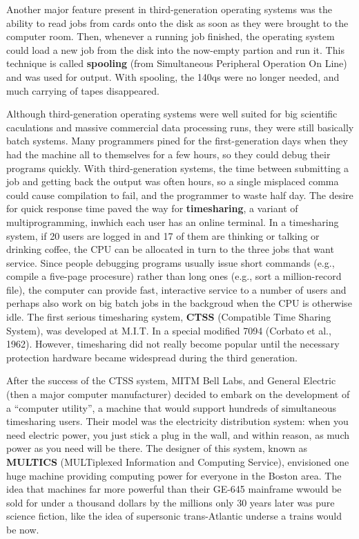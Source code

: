 \documentclass{book}
\newcommand {\kw}  [1] {\textbf{#1}}
\begin{document}
Another major feature present in third-generation operating systems was the ability to read jobs from cards onto the disk 
as soon as they were brought to the computer room.
Then, whenever a running job finished, the operating system could load a new job from the disk into the now-empty partion and run it.
This technique is called \kw{spooling} (from Simultaneous Peripheral Operation On Line) and was used for output.
With spooling, the 140qs were no longer needed, and much carrying of tapes disappeared.

Although third-generation operating systems were well suited for big scientific caculations and massive commercial data processing runs, 
they were still basically batch systems.
Many programmers pined for the first-generation days when they had the machine all to themselves for a few hours, 
so they could debug their programs quickly.
With third-generation systems, the time between submitting a job and getting back the output was often hours, 
so a single misplaced comma could cause compilation to fail, and the programmer to waste half day.
The desire for quick response time paved the way for \kw{timesharing}, a variant of multiprogramming, inwhich each user has an online terminal.
In a timesharing system, if 20 users are logged in and 17 of them are thinking or talking or drinking coffee, 
the CPU can be allocated in turn to the three jobs that want service.
Since people debugging programs usually issue short commands (e.g., compile a five-page procesure) 
rather than long ones (e.g., sort a million-record file), the computer can provide fast, 
interactive service to a number of users and perhaps also work on big batch jobs in the backgroud when the CPU is otherwise idle.
The first serious timesharing system, \kw{CTSS} (Compatible Time Sharing System), was developed at M.I.T.
In a special modified 7094 (Corbato et al., 1962). 
However, timesharing did not really become popular until the necessary protection hardware became widespread during the third generation. 

After the success of the CTSS system, MITM Bell Labs, and General Electric (then a major computer manufacturer) decided to embark on 
the development of a ``computer utility'', a machine that would support hundreds of simultaneous timesharing users.
Their model was the electricity distribution system:
when you need electric power, you just stick a plug in the wall, and within reason, as much power as you need will be there.
The designer of this system, known as \kw{MULTICS} (MULTiplexed Information and Computing Service), 
envisioned one huge machine providing computing power for everyone in the Boston area.
The idea that machines far more powerful than their GE-645 mainframe wwould be sold for under a thousand dollars by the millions only 30 years later 
was pure science fiction, like the idea of supersonic trans-Atlantic underse a trains would be now.
\end{document}
